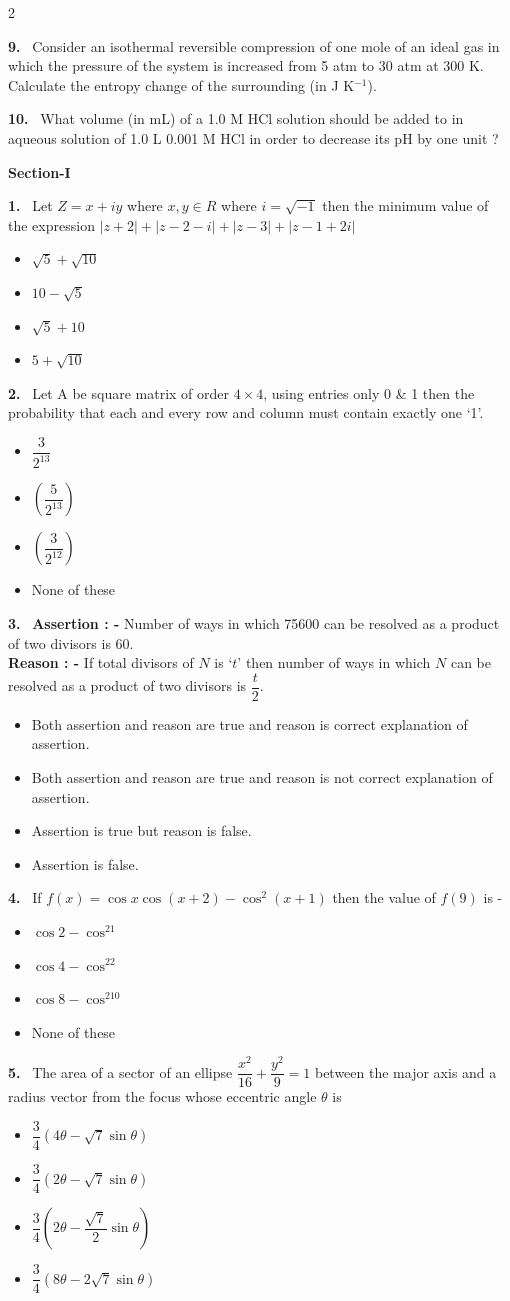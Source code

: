 \documentclass[10pt]{extarticle}
\newcommand{\partsec}[2]{\par\medskip\noindent{\large\bfseries PART-#1: #2}\par\smallskip}
\newcommand{\sect}[1]{\par\smallskip\noindent\textbf{#1}\par}
\newcommand{\qn}[1]{\par\smallskip\noindent\textbf{#1.}~}
\newenvironment{qoptions}{\begin{itemize}[leftmargin=1.8em,itemsep=1pt,topsep=2pt,label={}]}{\end{itemize}}
\newcommand{\opt}[2]{\item[(#1)] #2}
\begin{document}
\begin{multicols}{2}
\qn{9} Consider an isothermal reversible compression of one mole of an ideal gas in which the pressure of the system is increased from 5 atm to 30 atm at 300 K. Calculate the entropy change of the surrounding (in J K$^{-1}$).\\
\relax[Given: R = $\dfrac{25}3$ J mol$^{-1}$ K$^{-1}$, ln 6 = 1.8]

\qn{10} What volume (in mL) of a 1.0 M HCl solution should be added to in aqueous solution of 1.0 L 0.001 M HCl in order to decrease its pH by one unit ?

\partsec{3}{MATHEMATICS}
\sect{Section-I}

\qn{1} Let $Z=x+iy$ where $x,y\in R$ where $i=\sqrt{-1}$ then the minimum value of the expression $|z+2|+|z-2-i|+|z-3|+|z-1+2i|$
\begin{qoptions}
\opt{A}{$\sqrt5+\sqrt{10}$}
\opt{B}{$10-\sqrt5$}
\opt{C}{$\sqrt5+10$}
\opt{D}{$5+\sqrt{10}$}
\end{qoptions}

\qn{2} Let A be square matrix of order $4\times4$, using entries only 0 \& 1 then the probability that each and every row and column must contain exactly one `1'.
\begin{qoptions}
\opt{A}{$\dfrac3{2^{13}}$}
\opt{B}{$\left(\dfrac5{2^{13}}\right)$}
\opt{C}{$\left(\dfrac3{2^{12}}\right)$}
\opt{D}{None of these}
\end{qoptions}

\qn{3} \textbf{Assertion : -} Number of ways in which 75600 can be resolved as a product of two divisors is 60.\\
\textbf{Reason : -} If total divisors of $N$ is `$t$' then number of ways in which $N$ can be resolved as a product of two divisors is $\dfrac t2$.
\begin{qoptions}
\opt{A}{Both assertion and reason are true and reason is correct explanation of assertion.}
\opt{B}{Both assertion and reason are true and reason is not correct explanation of assertion.}
\opt{C}{Assertion is true but reason is false.}
\opt{D}{Assertion is false.}
\end{qoptions}

\qn{4} If $f(x)=\cos x\cos(x+2)-\cos^2(x+1)$ then the value of $f(9)$ is -
\begin{qoptions}
\opt{A}{$\cos2-\cos^21$}
\opt{B}{$\cos4-\cos^22$}
\opt{C}{$\cos8-\cos^210$}
\opt{D}{None of these}
\end{qoptions}

\qn{5} The area of a sector of an ellipse $\dfrac{x^2}{16}+\dfrac{y^2}9=1$ between the major axis and a radius vector from the focus whose eccentric angle $\theta$ is
\begin{qoptions}
\opt{A}{$\dfrac34\left(4\theta-\sqrt7\sin\theta\right)$}
\opt{B}{$\dfrac34\left(2\theta-\sqrt7\sin\theta\right)$}
\opt{C}{$\dfrac34\left(2\theta-\dfrac{\sqrt7}2\sin\theta\right)$}
\opt{D}{$\dfrac34\left(8\theta-2\sqrt7\sin\theta\right)$}
\end{qoptions}


\end{multicols}
\end{document}
